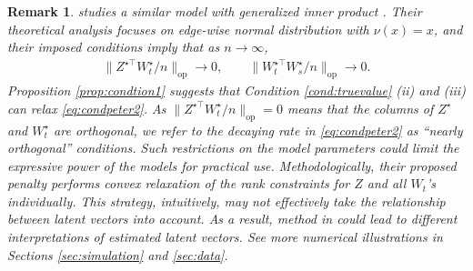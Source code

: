 \documentclass[12pt]{article}
\newcommand{\blue}[1]{\textcolor{blue}{#1}}
\newcommand{\red}[1]{\textcolor{red}{#1}}
\newtheorem{remark}{Remark}
\newcommand{\mytrans}{\top}
\begin{document}
\begin{remark} \label{rmk:compare_peter}
\cite{macdonald2022latent} studies a similar model with generalized inner product \citep{rubin2022statistical}. Their theoretical analysis focuses on edge-wise normal distribution with $\nu(x)=x$, and  
their imposed  conditions imply  that as $n\to \infty$, 
\begin{align}\label{eq:condpeter2}
    \|Z^{\star\mytrans} W_t^{\star}/n\|_{\operatorname{op}}\to 0 , \quad \quad \|W_t^{\star \mytrans} W_s^{\star}/n\|_{\operatorname{op}}\to 0.   
\end{align} 
Proposition \ref{prop:condtion1} suggests  that  Condition \ref{cond:truevalue} (ii) and (iii) can relax \eqref{eq:condpeter2}. %
As $\|Z^{\star\mytrans} W_t^{\star}/n\|_{\operatorname{op}} = 0$
means that the columns of $Z^{\star}$ and $W_t^{\star}$ are orthogonal, we refer to the decaying rate in \eqref{eq:condpeter2} as ``nearly orthogonal'' conditions. 
Such restrictions on the model parameters could limit the expressive power of the models for practical use. %
Methodologically, their proposed penalty  performs convex  relaxation of the rank constraints for $Z$ and all $W_t$'s individually. This strategy, intuitively, may not effectively take the relationship between latent vectors into account.  
As a result, method in \cite{macdonald2022latent} could lead to different interpretations of estimated latent vectors. 
See more numerical illustrations in Sections \ref{sec:simulation} and \ref{sec:data}.  
\end{remark}
\end{document}
